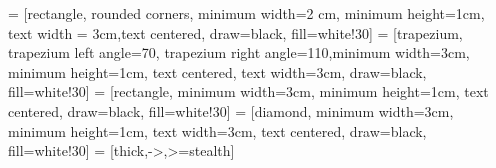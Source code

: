 \documentclass{article}
\begin{document}
 = [rectangle, rounded corners, minimum width=2
cm, minimum height=1cm, text width = 3cm,text centered, draw=black, fill=white!30]
 = [trapezium, trapezium left angle=70, trapezium right angle=110,minimum width=3cm, minimum height=1cm, text centered, text width=3cm, draw=black, fill=white!30]
 = [rectangle, minimum width=3cm, minimum height=1cm, text centered, draw=black, fill=white!30]
 = [diamond, minimum width=3cm, minimum height=1cm, text width=3cm, text centered, draw=black, fill=white!30]
 = [thick,->,>=stealth]
\end{document}
